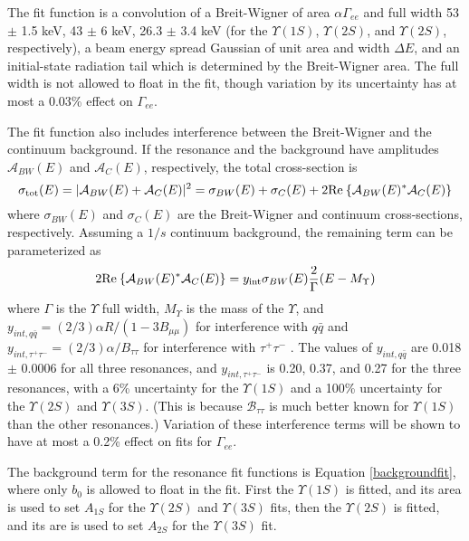 \documentclass[aps,prd,preprint,superscriptaddress,tightenlines,nofootinbib,floatfix]{revtex4}
\begin{document}
The fit function is a convolution of a Breit-Wigner of area
$\alpha\Gamma_{ee}$ and full width 53 $\pm$ 1.5 keV, 43 $\pm$ 6 keV,
26.3 $\pm$ 3.4 keV (for the $\Upsilon(1S)$, $\Upsilon(2S)$, and
$\Upsilon(2S)$, respectively), a beam energy spread Gaussian of unit
area and width $\Delta E$, and an initial-state radiation tail which
is determined by the Breit-Wigner area.  The full width is not allowed
to float in the fit, though variation by its uncertainty has at most a
0.03\% effect on $\Gamma_{ee}$.

The fit function also includes interference between the Breit-Wigner
and the continuum background.  If the resonance and the background
have amplitudes $\mathcal{A}_{BW}(E)$ and $\mathcal{A}_C(E)$,
respectively, the total cross-section is
\begin{equation}
  \sigma_{\mbox{\scriptsize tot}}(E) = |\mathcal{A}_{BW}(E) + \mathcal{A}_C(E)|^2 =
  \sigma_{BW}(E) + \sigma_C(E) + 2
  \mathrm{Re\:}\{\mathcal{A}_{BW}(E)^* \mathcal{A}_C(E)\}
\end{equation}
where $\sigma_{BW}(E)$ and $\sigma_C(E)$ are the Breit-Wigner and
continuum cross-sections, respectively.  Assuming a $1/s$ continuum
background, the remaining term can be parameterized as
\begin{equation}
  2 \mathrm{Re\:}\{\mathcal{A}_{BW}(E)^* \mathcal{A}_C(E)\} =
  y_{\mbox{\scriptsize int}} \sigma_{BW}(E) \frac{2}{\Gamma} (E - M_{\Upsilon})
\end{equation}
where $\Gamma$ is the $\Upsilon$ full width, $M_{\Upsilon}$ is the
mass of the $\Upsilon$, and $y_{int, q\bar{q}} = (2/3)\alpha R/(1-3 B_{\mu\mu})$
for interference with $q\bar{q}$ and $y_{int, \tau^+\tau^-} =
(2/3)\alpha/B_{\tau\tau}$ for interference with $\tau^+\tau^-$
\cite{kb}.  The values of $y_{int, q\bar{q}}$ are 0.018 $\pm$ 0.0006
for all three resonances, and $y_{int, \tau^+\tau^-}$ is 0.20, 0.37,
and 0.27 for the three resonances, with a 6\% uncertainty for the
$\Upsilon(1S)$ and a 100\% uncertainty for the $\Upsilon(2S)$ and
$\Upsilon(3S)$.  (This is because $\mathcal{B}_{\tau\tau}$ is much
better known for $\Upsilon(1S)$ than the other resonances.)  Variation
of these interference terms will be shown to have at most a 0.2\%
effect on fits for $\Gamma_{ee}$.

The background term for the resonance fit functions is Equation
\ref{backgroundfit}, where only $b_0$ is allowed to float in the fit.
First the $\Upsilon(1S)$ is fitted, and its area is used to set
$A_{1S}$ for the $\Upsilon(2S)$ and $\Upsilon(3S)$ fits, then the
$\Upsilon(2S)$ is fitted, and its are is used to set $A_{2S}$ for the
$\Upsilon(3S)$ fit.
\end{document}
